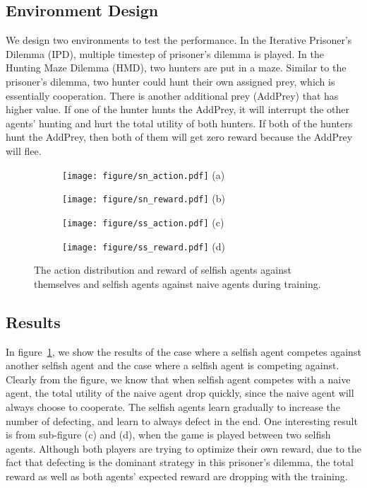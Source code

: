 \documentclass{article}
\begin{document}
\subsection{Environment Design}
We design two environments to test the performance.
In the Iterative Prisoner's Dilemma (IPD), multiple timestep of prisoner's dilemma is played.
In the Hunting Maze Dilemma (HMD), two hunters are put in a maze.
Similar to the prisoner's dilemma, two hunter could hunt their own assigned prey, which is essentially cooperation.
There is another additional prey (AddPrey) that has higher value.
If one of the hunter hunts the AddPrey, it will interrupt the other agents' hunting and hurt the total utility of both hunters.
If both of the hunters hunt the AddPrey, then both of them will get zero reward because the AddPrey will flee.
\begin{figure}
\begin{subfigure}{.24\textwidth}
\centering
\texttt{[image: figure/sn\_action.pdf]}
(a)
\end{subfigure}
\begin{subfigure}{.24\textwidth}
\centering
\texttt{[image: figure/sn\_reward.pdf]}
(b)
\end{subfigure}
\begin{subfigure}{.24\textwidth}
\centering
\texttt{[image: figure/ss\_action.pdf]}
(c)
\end{subfigure}
\begin{subfigure}{.24\textwidth}
\centering
\texttt{[image: figure/ss\_reward.pdf]}
(d)
\end{subfigure}
\caption{The action distribution and reward of selfish agents against themselves and selfish agents against naive agents during training.}
\label{fig:selfish}
\end{figure}

\subsection{Results}
In figure~\ref{fig:selfish},
we show the results of the case where a selfish agent competes against another selfish agent
and the case where a selfish agent is competing against.
Clearly from the figure, we know that when selfish agent competes with a naive agent,
the total utility of the naive agent drop quickly,
since the naive agent will always choose to cooperate.
The selfish agents learn gradually to increase the number of defecting,
and learn to always defect in the end.
One interesting result is from sub-figure (c) and (d),
when the game is played between two selfish agents.
Although both players are trying to optimize their own reward,
due to the fact that defecting is the dominant strategy in this prisoner's dilemma,
the total reward as well as both agents' expected reward are dropping with the training.\\
\end{document}
